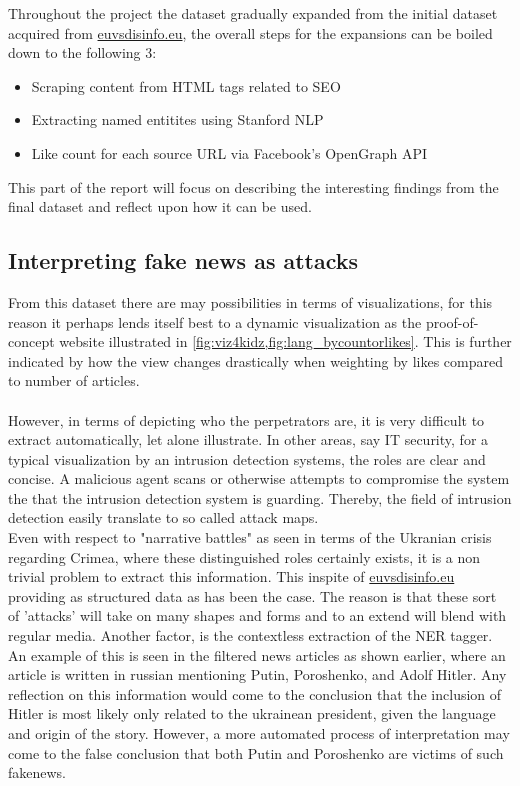 \documentclass{article}
\begin{document}
Throughout the project the dataset gradually expanded from the initial dataset acquired from \href{https://euvsdisinfo}{euvsdisinfo.eu}, the overall steps for the expansions can be boiled down to the following 3: 
\begin{itemize}
\item Scraping content from HTML tags related to SEO
\item Extracting named entitites using Stanford NLP
\item Like count for each source URL via Facebook's OpenGraph API 
\end{itemize}
This part of the report will focus on describing the interesting findings from the final dataset and reflect upon how it can be used.
\subsection{Interpreting fake news as attacks}
From this dataset there are may possibilities in terms of visualizations, for this reason it perhaps lends itself best to a dynamic visualization as the proof-of-concept website illustrated in \cref{fig:viz4kidz,fig:lang_bycountorlikes}. This is further indicated by how the view changes drastically when weighting by likes compared to number of articles.
\\\\
However, in terms of depicting who the perpetrators are, it is very difficult to extract automatically, let alone illustrate. In other areas, say IT security, for a typical visualization by an intrusion detection systems, the roles are clear and concise. A malicious agent scans or otherwise attempts to compromise the system the that the intrusion detection system is guarding. Thereby, the field of intrusion detection easily translate to so called attack maps.\\
Even with respect to "narrative battles" as seen in terms of the Ukranian crisis regarding Crimea, where these distinguished roles certainly exists, it is a non trivial problem to extract this information. This inspite of \href{https://euvsdisinfo}{euvsdisinfo.eu} providing as structured data as has been the case. The reason is that these sort of 'attacks' will take on many shapes and forms and to an extend will blend with regular media. Another factor, is the contextless extraction of the NER tagger. An example of this is seen in the filtered news articles as shown earlier, where an article is written in russian mentioning Putin, Poroshenko, and Adolf Hitler. Any reflection on this information would come to the conclusion that the inclusion of Hitler is most likely only related to the ukrainean president, given the language and origin of the story.
However, a more automated process of interpretation may come to the false conclusion that both Putin and Poroshenko are victims of such fakenews.
\end{document}
